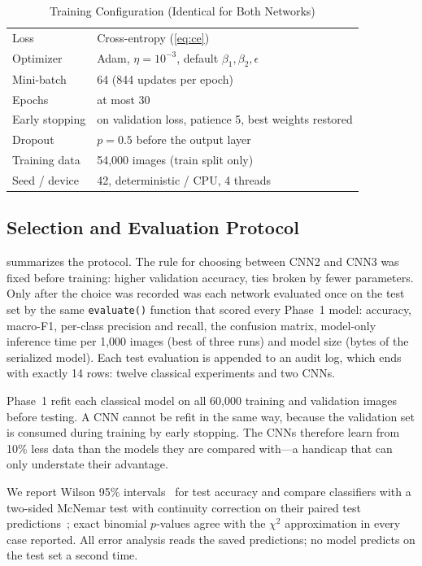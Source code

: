 \documentclass[conference]{IEEEtran}
\begin{document}
\begin{table}[t]
  \centering
  \caption{Training Configuration (Identical for Both Networks)}
  \label{tab:train}
  \begin{tabular}{@{}l l@{}}
    \toprule
    Loss & Cross-entropy (\cref{eq:ce}) \\
    Optimizer & Adam, $\eta=10^{-3}$, default $\beta_1,\beta_2,\epsilon$ \\
    Mini-batch & 64 (844 updates per epoch) \\
    Epochs & at most 30 \\
    Early stopping & on validation loss, patience 5, best weights restored \\
    Dropout & $p=0.5$ before the output layer \\
    Training data & 54{,}000 images (train split only) \\
    Seed / device & 42, deterministic / CPU, 4 threads \\
    \bottomrule
  \end{tabular}
\end{table}

\subsection{Selection and Evaluation Protocol}
 summarizes the protocol. The rule for choosing between CNN2 and CNN3 was fixed before training:
higher validation accuracy, ties broken by fewer parameters. Only after the choice was recorded was each network
evaluated once on the test set by the same \texttt{evaluate()} function that scored every Phase~1 model: accuracy,
macro-F1, per-class precision and recall, the confusion matrix, model-only inference time per 1{,}000 images (best of
three runs) and model size (bytes of the serialized model). Each test evaluation is appended to an audit log, which ends
with exactly 14 rows: twelve classical experiments and two CNNs.

Phase~1 refit each classical model on all 60{,}000 training and validation images before testing. A CNN cannot be refit
in the same way, because the validation set is consumed during training by early stopping. The CNNs therefore learn from
10\% less data than the models they are compared with---a handicap that can only understate their advantage.

We report Wilson 95\% intervals~\cite{wilson1927probable} for test accuracy and compare classifiers with a two-sided
McNemar test with continuity correction on their paired test predictions~\cite{mcnemar1947note,dietterich1998approximate};
exact binomial $p$-values agree with the $\chi^2$ approximation in every case reported. All error analysis reads the
saved predictions; no model predicts on the test set a second time.
\end{document}
